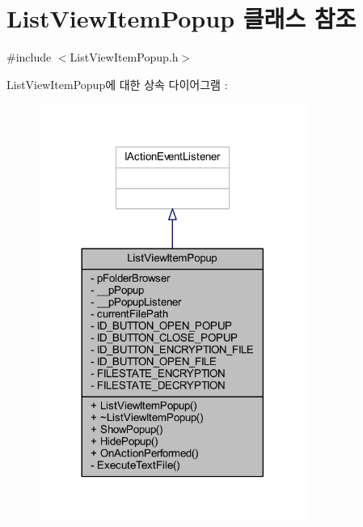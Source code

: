 \hypertarget{class_list_view_item_popup}{\section{List\+View\+Item\+Popup 클래스 참조}
\label{class_list_view_item_popup}
}


{\ttfamily \#include $<$List\+View\+Item\+Popup.\+h$>$}



List\+View\+Item\+Popup에 대한 상속 다이어그램 \+: 
\nopagebreak
\begin{figure}[H]
\begin{center}
\leavevmode
\includegraphics[width=248pt]{class_list_view_item_popup__inherit__graph}
\end{center}
\end{figure}


